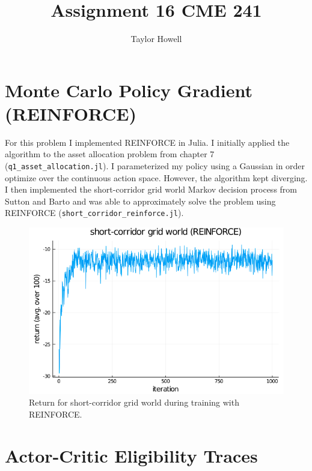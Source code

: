 \documentclass[12pt]{article}
\title{\textbf{Assignment 16 CME 241}}
\author{Taylor Howell}
\begin{document}
\maketitle

\newpage

\section{Monte Carlo Policy Gradient (REINFORCE)}
For this problem I implemented REINFORCE in Julia. I initially applied the algorithm to the asset allocation problem from chapter 7 (\texttt{q1_asset_allocation.jl}). I parameterized my policy using a Gaussian in order optimize over the continuous action space. However, the algorithm kept diverging. I then implemented the short-corridor grid world Markov decision process from Sutton and Barto and was able to approximately solve the problem using REINFORCE (\texttt{short_corridor_reinforce.jl}).

\begin{figure}[H]
	\centering
	\includegraphics[width=.75\textwidth]{figures/sc_gw_reinforce.png}
	\caption{Return for short-corridor grid world during training with REINFORCE.}
	\label{}
\end{figure}

\section{Actor-Critic Eligibility Traces}
\end{document}
